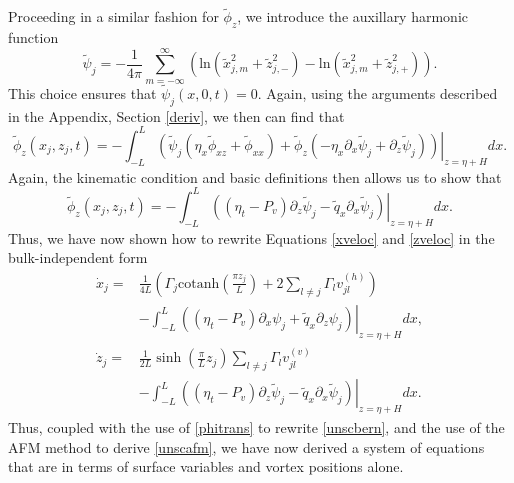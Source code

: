 \documentclass[a4paper,11pt]{article}
\newcommand{\p}{\partial}
\begin{document}
Proceeding in a similar fashion for $\tilde{\phi}_{z}$, we introduce the auxillary harmonic function
\[
\tilde{\psi}_{j} = -\frac{1}{4\pi}\sum_{m=-\infty}^{\infty} \left( \mbox{ln}\left( \tilde{x}_{j,m}^{2} + \tilde{z}_{j,-}^{2}  \right) - \mbox{ln}\left( \tilde{x}_{j,m}^{2} + \tilde{z}_{j,+}^{2} \right)\right).
\]
This choice ensures that $\tilde{\psi}_{j}(x,0,t) = 0$.  Again, using the arguments described in the Appendix, Section \ref{deriv}, we then can find that
\[
\tilde{\phi}_{z}(x_{j},z_{j},t) = -\int_{-L}^{L}\left.\left( \tilde{\psi}_{j}\left(\eta_{x}\tilde{\phi}_{xz}+\tilde{\phi}_{xx}\right)+\tilde{\phi}_{z}\left(-\eta_{x}\p_{x}\tilde{\psi}_{j}+\p_{z}\tilde{\psi}_{j}\right) \right)\right|_{z=\eta+H} dx.
\]
Again, the kinematic condition and basic definitions then allows us to show that
\[
\tilde{\phi}_{z}(x_{j},z_{j},t) = -\int_{-L}^{L}\left.\left( \left(\eta_{t}-P_{v}\right)\p_{z}\tilde{\psi}_{j} - \tilde{q}_{x}\p_{x}\tilde{\psi}_{j} \right)\right|_{z=\eta+H} dx.
\]
Thus, we have now shown how to rewrite Equations \eqref{xveloc} and \eqref{zveloc} in the bulk-independent form 
\begin{align}
\dot{x}_{j} = & \frac{1}{4L}\left(  \Gamma_{j}\mbox{cotanh}\left(\frac{\pi z_{j}}{L} \right)+2\sum_{l\neq j}\Gamma_{l}v_{jl}^{(h)} \right)\nonumber\\
&  -\int_{-L}^{L}\left.\left(\left(\eta_{t}-P_{v}\right)\p_{x}\psi_{j} + \tilde{q}_{x}\p_{z}\psi_{j} \right)\right|_{z=\eta + H} dx, \label{xdotb}\\
\dot{z}_{j} = &  \frac{1}{2L}\sinh\left(\frac{\pi}{L}z_{j}\right)\sum_{l\neq j} \Gamma_{l} v_{jl}^{(v)}\nonumber\\
& - \int_{-L}^{L}\left.\left( \left(\eta_{t}-P_{v}\right)\p_{z}\tilde{\psi}_{j} - \tilde{q}_{x}\p_{x}\tilde{\psi}_{j} \right)\right|_{z=\eta + H} dx. \label{zdotb}
\end{align}
Thus, coupled with the use of \eqref{phitrans} to rewrite \eqref{unscbern}, and the use of the AFM method to derive \eqref{unscafm}, we have now derived a system of equations that are in terms of surface variables and vortex positions alone.  
\end{document}
